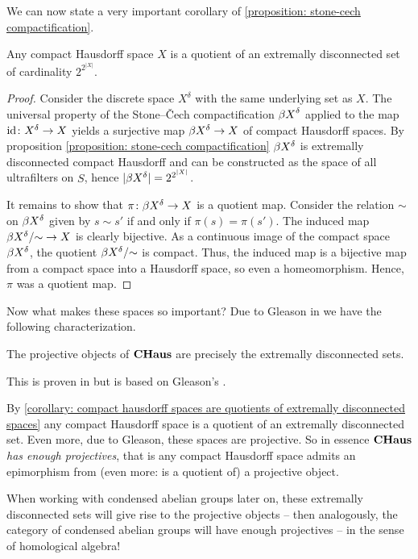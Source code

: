 We can now state a very important corollary of \ref{proposition: stone-cech compactification}.
\begin{corollary}
	\label{corollary: compact hausdorff spaces are quotients of extremally disconnected spaces}
	
	Any compact Hausdorff space $X$ is a quotient of an extremally disconnected set of cardinality $2^{2^{\vert X\vert}}$.
\end{corollary}
\begin{proof}
	Consider the discrete space $X^\delta$ with the same underlying set as $X$. The universal property of the Stone--\v Cech compactification ${{\beta} X}^\delta$ applied to the map $\mathrm{id}\colon X^\delta \to X$ yields a surjective map ${{\beta} X^\delta} \to X$ of compact Hausdorff spaces. By proposition \ref{proposition: stone-cech compactification} ${{\beta} X^\delta}$ is extremally disconnected compact Hausdorff and can be constructed as the space of all ultrafilters on $S$, hence $\vert {{\beta}X^\delta}\vert = 2^{2^{\vert X\vert}}$.
	
	It remains to show that $\pi\colon {{\beta}X^\delta} \to X$ is a quotient map. Consider the relation $\sim$ on ${{\beta} X^\delta}$ given by $s\sim s'$ if and only if $\pi(s)=\pi(s')$. The induced map ${{\beta} X^\delta}/{\sim} \to X$ is clearly bijective. As a continuous image of the compact space ${{\beta} X^\delta}$, the quotient ${{\beta} X^\delta}/{\sim}$ is compact. Thus, the induced map is a bijective map from a compact space into a Hausdorff space, so even a homeomorphism. Hence, $\pi$ was a quotient map.
\end{proof}

Now what makes these spaces so important? Due to Gleason in \cite{gleason} we have the following characterization.
\begin{theorem}
	\label{theorem: extremally disconnected spaces are projective}
	
	The projective objects of ${{\mathbf{CHaus}}}$ are precisely the extremally disconnected sets.
\end{theorem}
\begin{shortproof}
	This is proven in \cite[\href{https://stacks.math.columbia.edu/tag/08YN}{Tag 08YN}]{stacks-project} but is based on Gleason's \cite[Thm. 2.5]{gleason}.
\end{shortproof}

\begin{remark}
	By \ref{corollary: compact hausdorff spaces are quotients of extremally disconnected spaces} any compact Hausdorff space is a quotient of an extremally disconnected set. Even more, due to Gleason, these spaces are projective. So in essence ${{\mathbf{CHaus}}}$ \emph{has enough projectives}, that is any compact Hausdorff space admits an epimorphism from (even more: is a quotient of) a projective object.
	
	When working with condensed abelian groups later on, these extremally disconnected sets will give rise to the projective objects -- then analogously, the category of condensed abelian groups will have enough projectives -- in the sense of homological algebra!
\end{remark}

